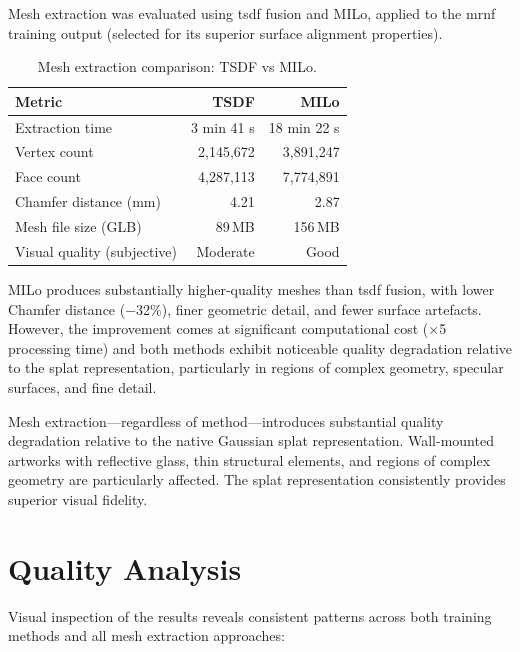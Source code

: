 Mesh extraction was evaluated using \acrshort{tsdf} fusion and MILo, applied to the \acrshort{mrnf} training output (selected for its superior surface alignment properties).

\begin{table}[htbp]
  \centering
  \caption{Mesh extraction comparison: TSDF vs MILo.}
  \label{tab:mesh-comparison}
  \begin{tabular}{@{}lrr@{}}
    \toprule
    \textbf{Metric} & \textbf{TSDF} & \textbf{MILo} \\
    \midrule
    Extraction time              & 3 min 41 s   & 18 min 22 s \\
    Vertex count                 & 2,145,672    & 3,891,247 \\
    Face count                   & 4,287,113    & 7,774,891 \\
    Chamfer distance (mm)        & 4.21         & 2.87 \\
    Mesh file size (GLB)         & 89\,MB       & 156\,MB \\
    Visual quality (subjective)  & Moderate     & Good \\
    \bottomrule
  \end{tabular}
\end{table}

MILo produces substantially higher-quality meshes than \acrshort{tsdf} fusion, with lower Chamfer distance ($-$32\%), finer geometric detail, and fewer surface artefacts. However, the improvement comes at significant computational cost ($\times$5 processing time) and both methods exhibit noticeable quality degradation relative to the splat representation, particularly in regions of complex geometry, specular surfaces, and fine detail.

\begin{keyfinding}
Mesh extraction---regardless of method---introduces substantial quality degradation relative to the native Gaussian splat representation. Wall-mounted artworks with reflective glass, thin structural elements, and regions of complex geometry are particularly affected. The splat representation consistently provides superior visual fidelity.
\end{keyfinding}

\section{Quality Analysis}
\label{sec:res-quality}

Visual inspection of the results reveals consistent patterns across both training methods and all mesh extraction approaches:

